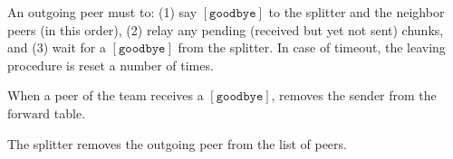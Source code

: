 
\label{sec:leaving}

An outgoing peer must to: (1) say $[\mathtt{goodbye}]$ to the splitter
and the neighbor peers (in this order), (2) relay any pending
(received but yet not sent) chunks, and (3) wait for a
$[\mathtt{goodbye}]$ from the splitter. In case of timeout, the
leaving procedure is reset a number of times.

When a peer of the team receives a $[\mathtt{goodbye}]$, removes the
sender from the $\text{forward}$ table.

The splitter removes the outgoing peer from the list of peers.


\begin{comment}
\begin{figure*}
  \fig{400}{4cm}{leaving}
  \caption{Leaving a team.\label{fig:leaving}}
\end{figure*}

All these rules have been describen in Fig.~\ref{fig:leaving}.
\end{comment}

\begin{comment}
An outgoing peer $P_o$ (see Fig.~\ref{fig:leaving}) must to: (1) say
$[\mathtt{goodbye}]$ to $S$ and to $T^o$ (in this order), (2)
relay any pending (received but yet not sent) chunks, and (3) wait for
a $[\mathtt{goodbye}]$ from $S$, which performs $T = T \setminus
P_o$. In case of a timeout, $P_o$ resets the leaving procedure,
for a maximum number of times.

When a $P_k$ receives a $[\mathtt{goodbye}]$ from $P_o$, $P_k$
removes $P_o$ from its neighbors set, by running $T^k = T^k
\setminus P_o$.
\end{comment}
